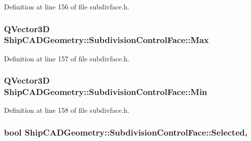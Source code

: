 Definition at line 156 of file subdivface.\-h.

\hypertarget{classShipCADGeometry_1_1SubdivisionControlFace_adb25745071d7a1f7b703c31f8518af41}{
\subsubsection[{Max}]{\setlength{\rightskip}{0pt plus 5cm}Q\-Vector3\-D Ship\-C\-A\-D\-Geometry\-::\-Subdivision\-Control\-Face\-::\-Max\hspace{0.3cm}{\ttfamily [read]}}}\label{classShipCADGeometry_1_1SubdivisionControlFace_adb25745071d7a1f7b703c31f8518af41}


Definition at line 157 of file subdivface.\-h.

\hypertarget{classShipCADGeometry_1_1SubdivisionControlFace_a34f00f0c4a50ea9124173c67041d9746}{
\subsubsection[{Min}]{\setlength{\rightskip}{0pt plus 5cm}Q\-Vector3\-D Ship\-C\-A\-D\-Geometry\-::\-Subdivision\-Control\-Face\-::\-Min\hspace{0.3cm}{\ttfamily [read]}}}\label{classShipCADGeometry_1_1SubdivisionControlFace_a34f00f0c4a50ea9124173c67041d9746}


Definition at line 158 of file subdivface.\-h.

\hypertarget{classShipCADGeometry_1_1SubdivisionControlFace_a61b316c367087520d43506a86be7caf5}{
\subsubsection[{Selected}]{\setlength{\rightskip}{0pt plus 5cm}bool Ship\-C\-A\-D\-Geometry\-::\-Subdivision\-Control\-Face\-::\-Selected\hspace{0.3cm}{\ttfamily [read]}, {\ttfamily [write]}}}\label{classShipCADGeometry_1_1SubdivisionControlFace_a61b316c367087520d43506a86be7caf5}


